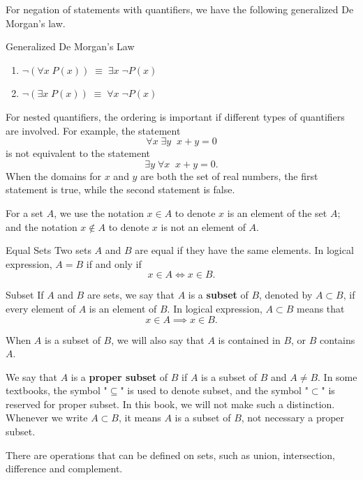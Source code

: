 For negation of statements with quantifiers, we have the following generalized De Morgan's law.

\begin{theorem}{Generalized De Morgan's Law}
\begin{enumerate}[1.]
\item $\neg\left(\forall x\;P(x)\right)\;\equiv\;\exists x\;\neg P(x)$
\item $\neg\left(\exists x\;P(x)\right)\;\equiv\;\forall x\;\neg P(x)$
\end{enumerate}
\end{theorem}

For nested quantifiers, the ordering is important if different types of quantifiers are involved. For example, the statement
\[\forall x\;\exists y\; \;x+y=0\] is not equivalent to the statement
\[\exists y\;\forall x\;\;x+y=0.\]When the domains for $x$ and $y$ are both the set of real numbers, the first statement is true, while the second statement is false.


 
For a set $A$, we use the notation $x\in A$ to denote $x$ is an element of the set $A$; and the notation $x\notin A$ to denote $x$ is not an element of $A$.

\begin{definition}{Equal Sets}
Two sets $A$ and $B$ are equal if they have the same elements. In logical expression, $A=B$ if and only if
\[x\in A\iff x\in B.\]
\end{definition}

\begin{definition}
{Subset}
If $A$ and $B$ are sets, we say that $A$ is a {\bf subset} of $B$,  denoted by $A\subset B$, if every element of $A$ is an element of $B$. In logical expression, $A\subset B$ means that
\[x\in A\implies x\in B.\]
\end{definition}

When $A$ is a subset of $B$, we will also say that  $A$ is contained in $B$, or $B$ contains $A$.


We say that $A$ is a {\bf proper subset} of $B$ if $A$ is a subset of $B$ and $A\neq B$. 
In some textbooks,  the symbol "$\subseteq$" is used to denote subset, and the symbol "$\subset$" is reserved for proper subset. In this book, we will not make such a distinction. Whenever we write $A\subset B$, it means $A$ is a subset of $B$, not necessary a proper subset.

There are   operations that can be defined on sets, such as union, intersection, difference and complement. 

